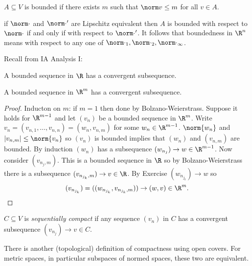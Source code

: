 \documentclass[a4paper]{article}
\theoremstyle{definition}
\begin{document}
\begin{definition}[Boundedness]
  \(A \subseteq V\) is bounded if there exists \(m\) such that \(\norm v \leq m \) for all \(v\in A\).
\end{definition}

\begin{remark}
  if \(\norm \cdot\) and \(\norm \cdot'\) are Lipschitz equivalent then \(A\) is bounded with respect to \(\norm \cdot\) if and only if with respect to \(\norm \cdot'\). It follows that boundedness in \(\R^n\) means with respect to any one of \(\norm \cdot_1, \norm \cdot_2, \norm \cdot_\infty\).
\end{remark}

Recall from IA Analysis I:
\begin{theorem}
  A bounded sequence in \(\R\) has a convergent subsequence.
\end{theorem}

\begin{corollary}
  A bounded sequence in \(\R^m\) has a convergent subsequence.
\end{corollary}

\begin{proof}
  Inducton on \(m\): if \(m=1\) then done by Bolzano-Weierstrass. Suppose it holds for \(\R^{m-1}\) and let \((v_n)\) be a bounded sequence in \(\R^m\). Write \(v_n = (v_{n,1},\dots,v_{n,n}) = (w_n,v_{n,m})\) for some \(w_n\in \R^{m-1}\). \(\norm{w_n}\) and \(|v_{n,m}| \leq \norm{v_n}\) so \((v_n)\) is bounded implies that \((w_n)\) and \((v_{n,m})\) are bounded. By induction \((w_n)\) has a subsequence \((w_{n_j}) \to w \in \R^{m-1}\). Now consider \((v_{n_j,m})\). This is a bounded sequence in \(\R\) so by Bolzano-Weierstrass there is a subsequence \((v_{n_{j_k},m}) \to v \in\R\). By Exercise \((w_{n_{j_k}}) \to w\) so
  \[
    (v_{n_{j_k}}) = ((w_{n_{j_k}},v_{n_{j_k},m})) \to (w, v) \in \R^m.
  \]
\end{proof}

\begin{definition}
  \(C \subseteq V\) is \emph{sequentially compact} if any sequence \((v_n)\) in \(C\) has a convergent subsequence \((v_{n_j}) \to v \in C\).
\end{definition}

\begin{remark}
  There is another (topological) definition of compactness using open covers. For metric spaces, in particular subspaces of normed spaces, these two are equivalent.
\end{remark}
\end{document}

